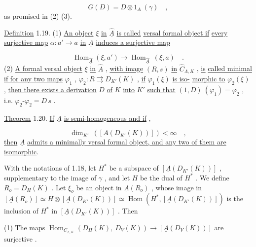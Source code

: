 \begin{equation*}
G(D) = D \otimes 1_{A}\ (\gamma) \quad ,
\end{equation*}
as promised in (2) (3).

\underline{Definition} 1.19.   (1) \underline{An object}  $\xi$  \underline{in}  $\widehat{\underline{A}}$  \underline{is called}   \underline{versal formal object if} \underline{every surjective map}  $\alpha : a' \longrightarrow a$  \underline{in}  $\underline{A}$  \underline{induces a surjective map}

\begin{equation*}
\operatorname{Hom}_{\widehat{\underline{A}}}(\xi, a') \longrightarrow \operatorname{Hom}_{\widehat{\underline{A}}}\ (\xi, a) \quad .
\end{equation*}
(2)   \underline{A formal versal object}  $\xi$  \underline{in}  $\widehat{A}$  , \underline{with image}  $(R, s)$  \underline{in}  $\widehat{C}_{\Lambda,K}$  , \underline{is} \underline{called  minimal  if for any two maps}  $\varphi_{1}$ , $\varphi_{2} : R \rightrightarrows D_{K'}(K)$  , \underline{if}  $\varphi_{1}(\xi)$  \underline{is iso-} \underline{morphic to}  $\varphi_{2}(\xi)$  , \underline{then there exists a derivation}  $D$  \underline{of}  $K$  \underline{into}  $K'$  \underline{such that}  $(1, D)\ (\varphi_{1}) = \varphi_{2}$  , i.e.  $\varphi_{2}\text{-}\varphi_{2} = D\,s$  .

\underline{Theorem} 1.20.   \underline{If}  $\underline{A}$  \underline{is semi-homogeneous and if}  ,

\begin{equation*}
\dim_{K'}\ ([A(D_{K'}(K))]) < \infty \quad ,
\end{equation*}
\underline{then}  $\underline{A}$  \underline{admits a minimally versal formal object, and any two of them are}
\underline{isomorphic}.

With the notations of 1.18, let  $H^*$  be a subspace of  $[\underline{A}(D_{K'}(K))]$ , supplementary to the image of  $\gamma$ , and let  $H$  be the dual of  $H^*$ . We define $R_o = D_H(K)$ . Let  $\xi_o$  be an object in  $\underline{A}(R_o)$ , whose image in $[\underline{A}(R_o)] \simeq H \otimes [\underline{A}(D_{K'}(K))] \simeq \operatorname{Hom}(H^*,[\underline{A}(D_{K'}(K))])$  is the inclusion of  $H^*$  in $[\underline{A}(D_{K'}(K))]$ . Then

(1)  The maps  $\operatorname{Hom}_{C_{\wedge,K}}(D_H(K),\ D_V(K)) \longrightarrow [\underline{A}(D_V(K))]$  are surjective .

